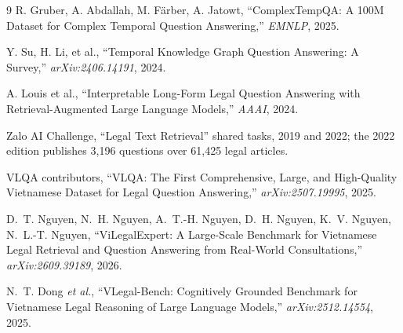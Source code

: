 \documentclass[10pt,a4paper,twocolumn]{article}
\begin{document}
\begin{thebibliography}{9}
 R. Gruber, A. Abdallah, M. F\"arber, A. Jatowt, ``ComplexTempQA: A 100M Dataset for Complex Temporal Question Answering,'' \emph{EMNLP}, 2025.

 Y. Su, H. Li, et al., ``Temporal Knowledge Graph Question Answering: A Survey,'' \emph{arXiv:2406.14191}, 2024.

 A. Louis et al., ``Interpretable Long-Form Legal Question Answering with Retrieval-Augmented Large Language Models,'' \emph{AAAI}, 2024.

 Zalo AI Challenge, ``Legal Text Retrieval'' shared tasks, 2019 and 2022; the 2022 edition publishes 3{,}196 questions over 61{,}425 legal articles.

 VLQA contributors, ``VLQA: The First Comprehensive, Large, and High-Quality Vietnamese Dataset for Legal Question Answering,'' \emph{arXiv:2507.19995}, 2025.

 D.\ T. Nguyen, N.\ H. Nguyen, A.\ T.-H. Nguyen, D.\ H. Nguyen, K.\ V. Nguyen, N.\ L.-T. Nguyen, ``ViLegalExpert: A Large-Scale Benchmark for Vietnamese Legal Retrieval and Question Answering from Real-World Consultations,'' \emph{arXiv:2609.39189}, 2026.

 N.\ T. Dong \emph{et al.}, ``VLegal-Bench: Cognitively Grounded Benchmark for Vietnamese Legal Reasoning of Large Language Models,'' \emph{arXiv:2512.14554}, 2025.

\end{thebibliography}
\end{document}
